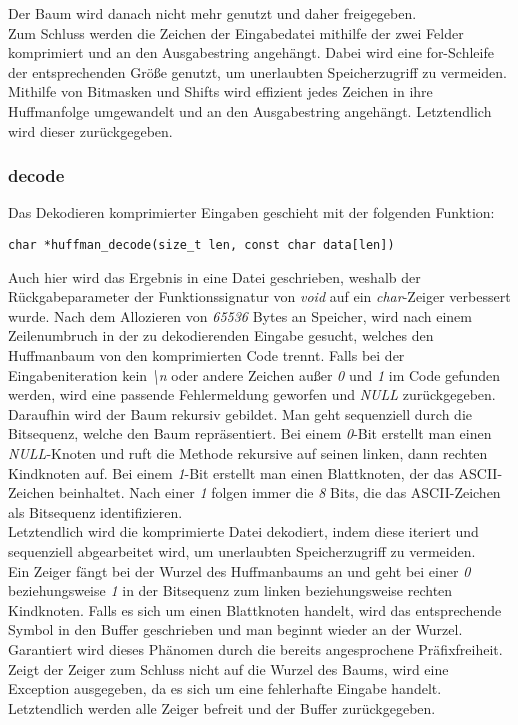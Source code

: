 \documentclass[course=erap]{aspdoc}
\begin{document}
Der Baum wird danach nicht mehr genutzt und daher freigegeben.\\
Zum Schluss werden die Zeichen der Eingabedatei mithilfe der zwei Felder komprimiert und an den Ausgabestring angehängt. Dabei wird eine for-Schleife der entsprechenden Größe genutzt, um unerlaubten Speicherzugriff zu vermeiden. Mithilfe von Bitmasken und Shifts wird effizient jedes Zeichen in ihre Huffmanfolge umgewandelt und an den Ausgabestring angehängt. Letztendlich wird dieser zurückgegeben.

\subsubsection{decode}
Das Dekodieren komprimierter Eingaben geschieht mit der folgenden Funktion:
\begin{center}
    \begin{lstlisting}[frame=single, framerule=0pt, numbers=none]
        char *huffman_decode(size_t len, const char data[len])
    \end{lstlisting}
\end{center}
Auch hier wird das Ergebnis in eine Datei geschrieben, weshalb der Rückgabeparameter der Funktionssignatur von \textit{void} auf ein \textit{char}-Zeiger verbessert wurde. Nach dem Allozieren von \textit{65536} Bytes an Speicher, wird nach einem Zeilenumbruch in der zu dekodierenden Eingabe gesucht, welches den Huffmanbaum von den komprimierten Code trennt. Falls bei der Eingabeniteration kein \textit{\textbackslash n} oder andere Zeichen außer \textit{0} und \textit{1} im Code gefunden werden, wird eine passende Fehlermeldung geworfen und \textit{NULL} zurückgegeben.\\
Daraufhin wird der Baum rekursiv gebildet. Man geht sequenziell durch die Bitsequenz, welche den Baum repräsentiert. Bei einem \textit{0}-Bit erstellt man einen \textit{NULL}-Knoten und ruft die Methode rekursive auf seinen linken, dann rechten Kindknoten auf. Bei einem \textit{1}-Bit erstellt man einen Blattknoten, der das ASCII-Zeichen beinhaltet. Nach einer \textit{1} folgen immer die \textit{8} Bits, die das ASCII-Zeichen als Bitsequenz identifizieren.\\
Letztendlich wird die komprimierte Datei dekodiert, indem diese iteriert und sequenziell abgearbeitet wird, um unerlaubten Speicherzugriff zu vermeiden.\\
Ein Zeiger fängt bei der Wurzel des Huffmanbaums an und geht bei einer \textit{0} beziehungsweise \textit{1} in der Bitsequenz zum linken beziehungsweise rechten Kindknoten. Falls es sich um einen Blattknoten handelt, wird das entsprechende Symbol in den Buffer geschrieben und man beginnt wieder an der Wurzel. Garantiert wird dieses Phänomen durch die bereits angesprochene Präfixfreiheit.\\
Zeigt der Zeiger zum Schluss nicht auf die Wurzel des Baums, wird eine Exception ausgegeben, da es sich um eine fehlerhafte Eingabe handelt.
Letztendlich werden alle Zeiger befreit und der Buffer zurückgegeben.
\end{document}
